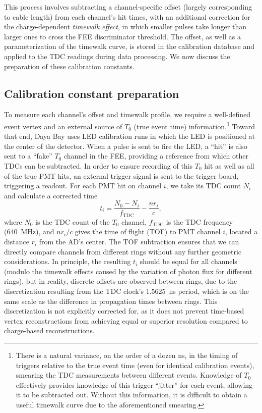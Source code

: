 \documentclass[../thesis.tex]{subfiles}
\begin{document}
This process involves subtracting a channel-specific offset (largely corresponding to cable length) from each channel's hit times, with an additional correction for the charge-dependent \emph{timewalk effect}, in which smaller pulses take longer than larger ones to cross the FEE discriminator threshold. The offset, as well as a parameterization of the timewalk curve, is stored in the calibration database and applied to the TDC readings during data processing. We now discuss the preparation of these calibration constants.

\subsection{Calibration constant preparation}

To measure each channel's offset and timewalk profile, we require a well-defined event vertex and an external source of $T_0$ (true event time) information.\footnote{There is a natural variance, on the order of a dozen ns, in the timing of triggers relative to the true event time (even for identical calibration events), smearing the TDC measurements between different events. Knowledge of $T_0$ effectively provides knowledge of this trigger ``jitter'' for each event, allowing it to be subtracted out. Without this information, it is difficult to obtain a useful timewalk curve due to the aforementioned smearing.} Toward that end, Daya Bay uses LED calibration runs in which the LED is positioned at the center of the detector. When a pulse is sent to fire the LED, a ``hit'' is also sent to a ``fake'' $T_0$ channel in the FEE, providing a reference from which other TDCs can be subtracted. In order to ensure recording of this $T_0$ hit as well as all of the true PMT hits, an external trigger signal is sent to the trigger board, triggering a readout. For each PMT hit on channel $i$, we take its TDC count $N_i$ and calculate a corrected time
\begin{equation*}
  t_i = \frac{N_0 - N_i}{f_\mathrm{TDC}} - \frac{n r_i}{c},  
\end{equation*}
where $N_0$ is the TDC count of the $T_0$ channel, $f_\mathrm{TDC}$ is the TDC frequency (640~MHz), and $nr_i/c$ gives the time of flight (TOF) to PMT channel $i$, located a distance $r_i$ from the AD's center. The TOF subtraction ensures that we can directly compare channels from different rings without any further geometric considerations. In principle, the resulting $t_i$ should be equal for all channels (modulo the timewalk effects caused by the variation of photon flux for different rings), but in reality, discrete offsets are observed between rings, due to the discretization resulting from the TDC clock's 1.5625~ns  period, which is on the same scale as the difference in propagation times between rings. This discretization is not explicitly corrected for, as it does not prevent time-based vertex reconstructions from achieving equal or superior resolution compared to charge-based reconstructions.
\end{document}
